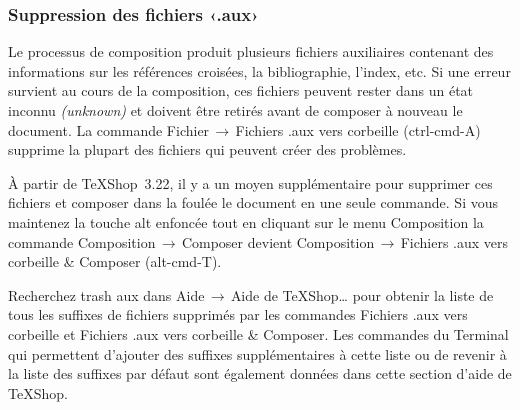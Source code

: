\documentclass[11pt,french]{article}
\newcommand{\TS}{\textsf{\TeX Shop}}
\newcommand{\cmd}[1]{\textsf{#1}}
\newcommand{\mnu}[1]{\textsf{#1}}
\newcommand{\To}{\,\(\to\)\,}
\begin{document}
\subsubsection{Suppression des fichiers ‹\cmd{.aux}›}  

%
%

Le processus de composition produit plusieurs fichiers auxiliaires contenant des informations sur les références croisées, la bibliographie, l'index, etc. Si une erreur survient au cours de la composition, ces fichiers peuvent rester dans un état inconnu \emph{(unknown)} et doivent être retirés avant de composer à nouveau le document. La commande \mnu{Fichier}\To\mnu{Fichiers .aux vers corbeille} (\cmd{ctrl-cmd-A}) supprime la plupart des fichiers qui peuvent créer des problèmes. 

À partir de \TS\ 3.22, il y a un moyen supplémentaire pour supprimer ces fichiers et composer dans la foulée le document en une seule commande. Si vous maintenez la touche \cmd{alt} enfoncée tout en cliquant sur le menu \mnu{Composition} la commande \mnu{Composition}\To\mnu{Composer} devient \mnu{Composition}\To\mnu{Fichiers .aux vers corbeille \& Composer} (\cmd{alt-cmd-T}). 

Recherchez \cmd{trash aux} dans \mnu{Aide}\To\mnu{Aide de TeXShop…} pour obtenir la liste de tous les suffixes de fichiers supprimés par les commandes \mnu{Fichiers .aux vers corbeille} et \mnu{Fichiers .aux vers corbeille \& Composer}. Les commandes du \cmd{Terminal} qui permettent d'ajouter des suffixes supplémentaires à cette liste ou de revenir à la liste des suffixes par défaut sont également données dans cette section d'aide de \TS.
\end{document}
